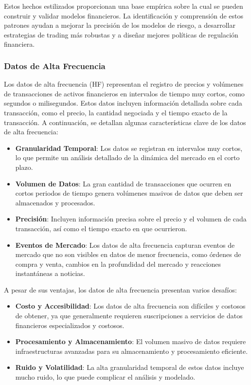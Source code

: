 \documentclass[a4paper,12pt, twoside]{report}
\begin{document}
Estos hechos estilizados proporcionan una base empírica sobre la cual se pueden construir y validar modelos financieros. La identificación 
y comprensión de estos patrones ayudan a mejorar la precisión de los modelos de riesgo, a desarrollar estrategias de trading más robustas 
y a diseñar mejores políticas de regulación financiera.


\subsubsection{Datos de Alta Frecuencia}

Los datos de alta frecuencia (HF) representan el registro de precios y volúmenes de transacciones de activos financieros en intervalos 
de tiempo muy cortos, como segundos o milisegundos. Estos datos incluyen información detallada sobre cada transacción, como el precio, 
la cantidad negociada y el tiempo exacto de la transacción. A continuación, se detallan algunas características clave de los datos de 
alta frecuencia:

\begin{itemize}
    \item \textbf{Granularidad Temporal}: Los datos se registran en intervalos muy cortos, lo que permite un análisis detallado de la 
    dinámica del mercado en el corto plazo.
    \item \textbf{Volumen de Datos}: La gran cantidad de transacciones que ocurren en cortos periodos de tiempo genera volúmenes 
    masivos de datos que deben ser almacenados y procesados.
    \item \textbf{Precisión}: Incluyen información precisa sobre el precio y el volumen de cada transacción, así como el tiempo exacto 
    en que ocurrieron.
    \item \textbf{Eventos de Mercado}: Los datos de alta frecuencia capturan eventos de mercado que no son visibles en datos de menor 
    frecuencia, como órdenes de compra y venta, cambios en la profundidad del mercado y reacciones instantáneas a noticias.
\end{itemize}

A pesar de sus ventajas, los datos de alta frecuencia presentan varios desafíos:

\begin{itemize}
    \item \textbf{Costo y Accesibilidad}: Los datos de alta frecuencia son difíciles y costosos de obtener, ya que generalmente requieren 
    suscripciones a servicios de datos financieros especializados y costosos.
    \item \textbf{Procesamiento y Almacenamiento}: El volumen masivo de datos requiere infraestructuras avanzadas para su almacenamiento 
    y procesamiento eficiente.
    \item \textbf{Ruido y Volatilidad}: La alta granularidad temporal de estos datos incluye mucho ruido, lo que puede complicar el 
    análisis y modelado.
\end{itemize}
\end{document}
